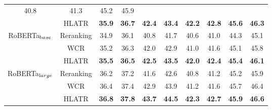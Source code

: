 \documentclass[11pt]{article}
\begin{document}
\begin{table*}[t]
{\begin{tabular}{@{}cccccccccc@{}}
  40.8 &
  \multicolumn{1}{c|}{41.3} &
  45.2 &
  45.9 \\
\multicolumn{1}{c|}{} &
  \multicolumn{1}{c|}{HLATR} &
  \textbf{35.9} &
  \multicolumn{1}{c|}{\textbf{36.7}} &
  \textbf{42.4} &
  \multicolumn{1}{c|}{\textbf{43.4}} &
  \textbf{42.2} &
  \multicolumn{1}{c|}{\textbf{42.8}} &
  \textbf{45.6} &
  \textbf{46.3} \\ \midrule
\multicolumn{1}{c|}{\multirow{3}{*}{RoBERTa$_{\text base}$}} &
  \multicolumn{1}{c|}{Reranking} &
  34.9 &
  \multicolumn{1}{c|}{36.1} &
  40.8 &
  \multicolumn{1}{c|}{41.7} &
  40.6 &
  \multicolumn{1}{c|}{41.0} &
  44.3 &
  45.1 \\
\multicolumn{1}{c|}{} &
  \multicolumn{1}{c|}{WCR} &
  35.2 &
  \multicolumn{1}{c|}{36.3} &
  42.0 &
  \multicolumn{1}{c|}{42.9} &
  41.0 &
  \multicolumn{1}{c|}{41.6} &
  45.1 &
  45.8 \\
\multicolumn{1}{c|}{} &
  \multicolumn{1}{c|}{HLATR} &
  \textbf{35.5} &
  \multicolumn{1}{c|}{\textbf{36.5}} &
  \textbf{42.5} &
  \multicolumn{1}{c|}{\textbf{43.5}} &
  \textbf{42.0} &
  \multicolumn{1}{c|}{\textbf{42.4}} &
  \textbf{45.4} &
  \textbf{46.1} \\ \midrule
\multicolumn{1}{c|}{\multirow{3}{*}{RoBERTa$_{\text large}$}} &
  \multicolumn{1}{c|}{Reranking} &
  36.2 &
  \multicolumn{1}{c|}{37.2} &
  41.6 &
  \multicolumn{1}{c|}{42.6} &
  40.8 &
  \multicolumn{1}{c|}{41.2} &
  45.2 &
  45.9 \\
\multicolumn{1}{c|}{} &
  \multicolumn{1}{c|}{WCR} &
  36.4 &
  \multicolumn{1}{c|}{37.4} &
  42.9 &
  \multicolumn{1}{c|}{43.9} &
  41.2 &
  \multicolumn{1}{c|}{41.6} &
  45.7 &
  46.4 \\
\multicolumn{1}{c|}{} &
  \multicolumn{1}{c|}{HLATR} &
  \textbf{36.8} &
  \multicolumn{1}{c|}{\textbf{37.8}} &
  \textbf{43.7} &
  \multicolumn{1}{c|}{\textbf{44.5}} &
  \textbf{42.3} &
  \multicolumn{1}{c|}{\textbf{42.7}} &
  \textbf{45.9} &
  \textbf{46.6} \\ \bottomrule
\end{tabular}
}
\end{table*}
\end{document}
